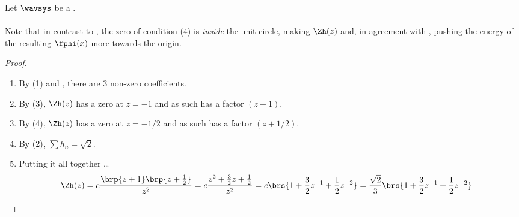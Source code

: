\begin{example}
\label{ex:h_2_3_1}
Let $\wavsys$ be a .
  \\\indentx{}
    \indentx{}
    \indentx{}
\\Note that in contrast to , the zero of condition (4) is \emph{inside}
the unit circle, making $\Zh(z)$   and,
in agreement with ,
pushing the energy of the resulting $\fphi(x)$ more towards the origin.
\end{example}
\begin{proof}
\begin{enumerate}
  \item By (1) and , there are 3 non-zero coefficients.
  \item By (3), $\Zh(z)$ has a zero at $z=-1$ and as such has a factor $(z+1)$.
  \item By (4), $\Zh(z)$ has a zero at $z=-1/2$ and as such has a factor $(z+1/2)$.
  \item By (2), $\sum h_n=\sqrt{2}$.
  \item Putting it all together \ldots
  \begin{align*}
    \Zh(z) &= c\frac{\brp{z+1}\brp{z+\frac{1}{2}}}{z^2}
                      = c\frac{z^2 + \frac{3}{2}z + \frac{1}{2}}{z^2}
                      = c\brs{1 + \frac{3}{2}z^{-1} + \frac{1}{2}z^{-2}}
                      = \frac{\sqrt{2}}{3}\brs{1 + \frac{3}{2}z^{-1} + \frac{1}{2}z^{-2}}
  \end{align*}
\end{enumerate}
\end{proof}

